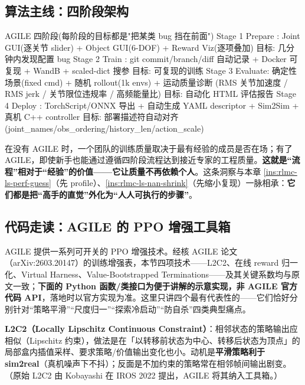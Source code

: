 \subsection{算法主线：四阶段架构}
\label{sec:rlmc-ls-agile-stages}

\begin{codebox}[text]{AGILE 四阶段(每阶段的目标都是"把某类 bug 挡在前面")}
Stage 1 Prepare : Joint GUI(逐关节 slider) + Object GUI(6-DOF) + Reward Viz(逐项叠加)
                  目标: 几分钟内发现配置 bug
Stage 2 Train   : git commit/branch/diff 自动记录 + Docker 可复现 + WandB + scaled-dict 搜参
                  目标: 可复现的训练
Stage 3 Evaluate: 确定性场景(fixed cmd) + 随机 rollout(1k envs) + 运动质量诊断
                  (RMS 关节加速度 / RMS jerk / 关节限位违规率 / 高频能量比)
                  目标: 自动化 HTML 评估报告
Stage 4 Deploy  : TorchScript/ONNX 导出 + 自动生成 YAML descriptor + Sim2Sim + 真机 C++ controller
                  目标: 部署描述符自动对齐(joint_names/obs_ordering/history_len/action_scale)
\end{codebox}

\begin{insight}\label{ins:rlmc-ls-agile}
在没有 AGILE 时，一个团队的训练质量取决于最有经验的成员是否在场；有了 AGILE，即使新手也能通过遵循四阶段流程达到接近专家的工程质量。\textbf{这就是“流程”相对于“经验”的价值——它让质量不再依赖个人}。这条洞察与本章 \cref{ins:rlmc-ls-perf-guess}（先 profile）、\cref{ins:rlmc-ls-nan-shrink}（先缩小复现）一脉相承：\textbf{它们都是把“高手的直觉”外化为“人人可执行的步骤”}。
\end{insight}

\subsection{代码走读：AGILE 的 PPO 增强工具箱}
\label{sec:rlmc-ls-agile-toolbox}

AGILE 提供一系列可开关的 PPO 增强技术。经核 AGILE 论文（arXiv:2603.20147）的训练增强表，本节四项技术——L2C2、在线 reward 归一化、Virtual Harness、Value-Bootstrapped Terminations——及其关键系数均与原文一致；\textbf{下面的 Python 函数/类接口为便于讲解的示意实现，非 AGILE 官方代码 API}，落地时以官方实现为准。这里只讲四个最有代表性的——它们恰好分别针对“策略平滑”“尺度归一”“探索冷启动”“防自杀”四类典型痛点。

\textbf{L2C2（Locally Lipschitz Continuous Constraint）}\cite{kobayashi2022l2c2}：相邻状态的策略输出应相似（Lipschitz 约束），做法是在「以转移前状态为中心、转移后状态为顶点」的局部盒内插值采样、要求策略/价值输出变化也小。动机是\textbf{平滑策略利于 sim2real}（真机噪声下不抖）；反面是不加约束的策略常在相邻帧间输出剧变。（原始 L2C2 由 Kobayashi 在 IROS 2022 提出，AGILE 将其纳入工具箱。）

